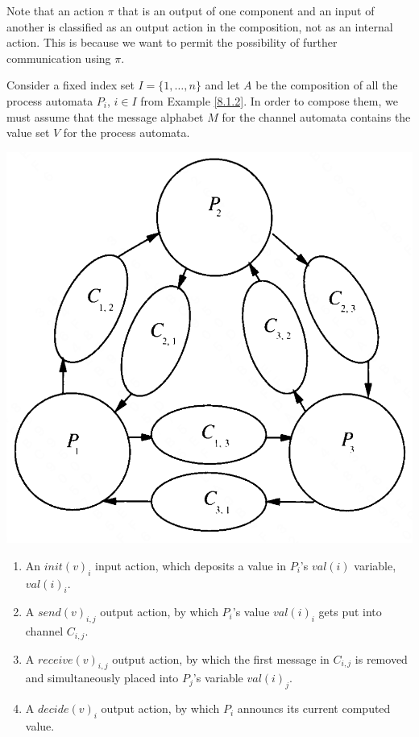 \documentclass[11pt]{article}
\begin{document}
Note that an action \(\pi\) that is an output of one component and an input of another is classified
as an output action in the composition, not as an internal action. This is because we want to permit
the possibility of further communication using \(\pi\).

\begin{examplle}
\label{8.2.1}
Consider a fixed index set \(I=\{1,\dots,n\}\) and let \(A\) be the composition of all the process
automata \(P_i\), \(i\in I\) from Example \ref{8.1.2}. In order to compose them, we must assume that the
message alphabet \(M\) for the channel automata contains the value set \(V\) for the process automata.
\begin{center}
\includegraphics[width=.8\textwidth]{../images/DistributedAlgorithms/3.png}
\end{center}

\begin{enumerate}
\item An \(init(v)_i\) input action, which deposits a value in \(P_i\)'s \(val(i)\) variable, \(val(i)_i\).
\item A \(send(v)_{i,j}\) output action, by which \(P_i\)'s value \(val(i)_i\) gets put into channel \(C_{i,j}\).
\item A \(receive(v)_{i,j}\) output action, by which the first message in \(C_{i,j}\) is removed and
simultaneously placed into \(P_j\)'s variable \(val(i)_j\).
\item A \(decide(v)_i\) output action, by which \(P_i\) announcs its current computed value.
\end{enumerate}
\end{examplle}
\end{document}
